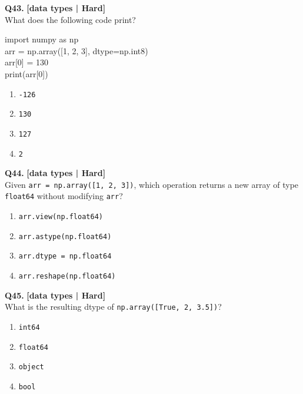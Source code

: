 \noindent\textbf{Q43.} \hfill {\small\color{LPUOrange}\textbf{[data types | Hard]}}\\[2pt]
What does the following code print? 

\begin{pycode}
import numpy as np\\
arr = np.array([1, 2, 3], dtype=np.int8)\\
arr[0] = 130\\
print(arr[0])
\end{pycode}

\begin{enumerate}[label=(\alph*),topsep=2pt,itemsep=1pt,partopsep=0pt,parsep=0pt]
    \item \relax \texttt{-126}
    \item \relax \texttt{130}
    \item \relax \texttt{127}
    \item \relax \texttt{2}
\end{enumerate}
\vspace{2mm}

\noindent\textbf{Q44.} \hfill {\small\color{LPUOrange}\textbf{[data types | Hard]}}\\[2pt]
Given \texttt{arr = np.array([1, 2, 3])}, which operation returns a new array of type \texttt{float64} without modifying \texttt{arr}?

\begin{enumerate}[label=(\alph*),topsep=2pt,itemsep=1pt,partopsep=0pt,parsep=0pt]
    \item \relax \texttt{arr.view(np.float64)}
    \item \relax \texttt{arr.astype(np.float64)}
    \item \relax \texttt{arr.dtype = np.float64}
    \item \relax \texttt{arr.reshape(np.float64)}
\end{enumerate}
\vspace{2mm}

\noindent\textbf{Q45.} \hfill {\small\color{LPUOrange}\textbf{[data types | Hard]}}\\[2pt]
What is the resulting dtype of \texttt{np.array([True, 2, 3.5])}?

\begin{enumerate}[label=(\alph*),topsep=2pt,itemsep=1pt,partopsep=0pt,parsep=0pt]
    \item \relax \texttt{int64}
    \item \relax \texttt{float64}
    \item \relax \texttt{object}
    \item \relax \texttt{bool}
\end{enumerate}
\vspace{2mm}

